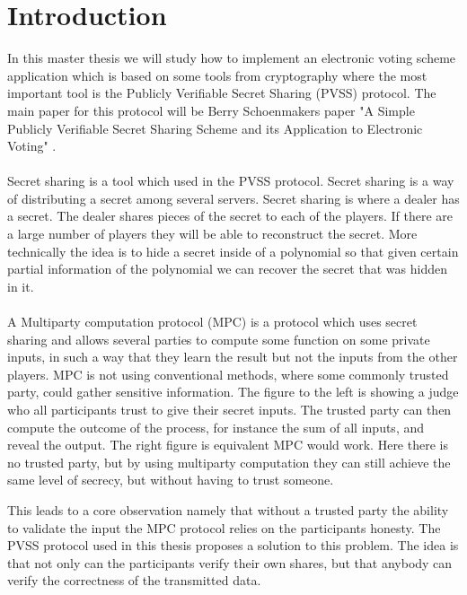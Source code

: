 \section{Introduction}
In this master thesis we will study how to implement an  electronic voting scheme application which is based on some tools from cryptography where the most important tool is the Publicly Verifiable Secret Sharing (PVSS) protocol. The main paper for this protocol will be Berry Schoenmakers paper "A Simple Publicly Verifiable Secret Sharing Scheme and its Application to Electronic Voting" \cite{Schoenmakers1999}. \\\\
\noindent
Secret sharing is a tool which used in the PVSS protocol. Secret sharing is a way of distributing a secret among several servers. Secret sharing is where a dealer has a secret. The dealer shares pieces of the secret to each of the players. If there are a large number of players they will be able to reconstruct the secret. More technically the idea is to hide a secret inside of a polynomial so that given certain partial information of the polynomial we can recover the secret that was hidden in it.\\\\
\noindent
A Multiparty computation protocol (MPC) is a protocol which uses secret sharing and allows several parties to compute some function on some private inputs, in such a way that they learn the result but not the inputs from the other players. MPC is not using conventional methods, where some commonly trusted party, could gather sensitive information. The figure to the left is showing a judge who all participants trust to give their secret inputs. The trusted party can then compute the outcome of the process, for instance the sum of all inputs, and reveal the output. The right figure is equivalent MPC would work. Here there is no trusted party, but by using multiparty computation they can still achieve the same level of secrecy, but without having to trust someone.
 
\begin{center}
\end{center}

\noindent
This leads to a core observation namely that without a trusted party the ability to validate the input the MPC protocol relies on the participants honesty. 
The PVSS protocol used in this thesis proposes a solution to this problem. The idea is that not only can the participants verify their own shares, but that anybody can verify the correctness of the transmitted data.
